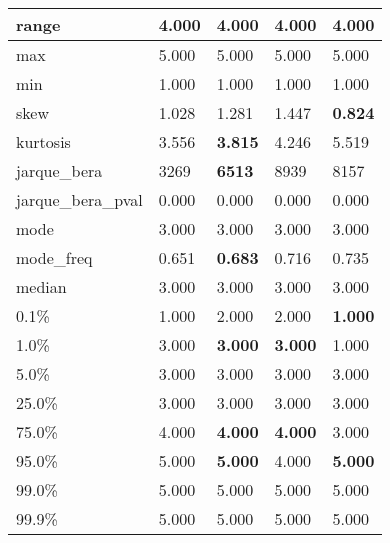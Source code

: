 \begin{table}[H]
\begin{tabular}{|l|m{10em}|m{10em}|m{10em}|m{10em}|}
\hline range & 4.000 & 4.000 & 4.000 & 4.000 \\
\hline max & 5.000 & 5.000 & 5.000 & 5.000 \\
\hline min & 1.000 & 1.000 & 1.000 & 1.000 \\
\hline skew & 1.028 & 1.281 & \cellcolor[rgb]{0.9, 0.54, 0.52} 1.447 & \bfseries 0.824 \\
\hline kurtosis & 3.556 & \bfseries 3.815 & 4.246 & \cellcolor[rgb]{0.9, 0.54, 0.52} 5.519 \\
\hline jarque\_bera & 3269 & \bfseries 6513 & \cellcolor[rgb]{0.9, 0.54, 0.52} 8939 & 8157 \\
\hline jarque\_bera\_pval & 0.000 & 0.000 & 0.000 & 0.000 \\
\hline mode & 3.000 & 3.000 & 3.000 & 3.000 \\
\hline mode\_freq & 0.651 & \bfseries 0.683 & 0.716 & \cellcolor[rgb]{0.9, 0.54, 0.52} 0.735 \\
\hline median & 3.000 & 3.000 & 3.000 & 3.000 \\
\hline 0.1\% & 1.000 & \cellcolor[rgb]{0.9, 0.54, 0.52} 2.000 & \cellcolor[rgb]{0.9, 0.54, 0.52} 2.000 & \bfseries 1.000 \\
\hline 1.0\% & 3.000 & \bfseries 3.000 & \bfseries 3.000 & \cellcolor[rgb]{0.9, 0.54, 0.52} 1.000 \\
\hline 5.0\% & 3.000 & 3.000 & 3.000 & 3.000 \\
\hline 25.0\% & 3.000 & 3.000 & 3.000 & 3.000 \\
\hline 75.0\% & 4.000 & \bfseries 4.000 & \bfseries 4.000 & \cellcolor[rgb]{0.9, 0.54, 0.52} 3.000 \\
\hline 95.0\% & 5.000 & \bfseries 5.000 & \cellcolor[rgb]{0.9, 0.54, 0.52} 4.000 & \bfseries 5.000 \\
\hline 99.0\% & 5.000 & 5.000 & 5.000 & 5.000 \\
\hline 99.9\% & 5.000 & 5.000 & 5.000 & 5.000 \\
\hline
\end{tabular}
\end{table}
